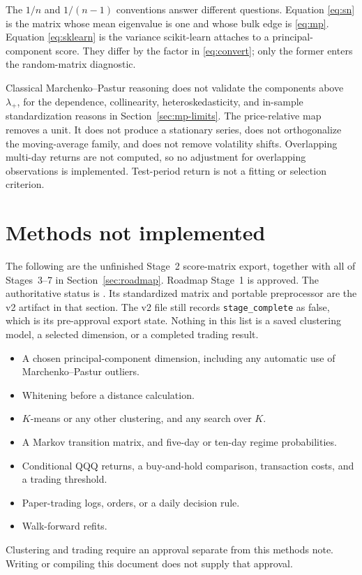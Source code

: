 \documentclass[11pt]{article}
\begin{document}
The \(1/n\) and \(1/(n-1)\) conventions answer different questions.
Equation \eqref{eq:sn} is the matrix whose mean eigenvalue is one and whose bulk edge is \eqref{eq:mp}.
Equation \eqref{eq:sklearn} is the variance scikit-learn attaches to a principal-component score.
They differ by the factor in \eqref{eq:convert}; only the former enters the random-matrix diagnostic.

Classical Marchenko--Pastur reasoning does not validate the components above \(\lambda_+\), for the dependence, collinearity, heteroskedasticity, and in-sample standardization reasons in Section~\ref{sec:mp-limits}.
The price-relative map removes a unit.
It does not produce a stationary series, does not orthogonalize the moving-average family, and does not remove volatility shifts.
Overlapping multi-day returns are not computed, so no adjustment for overlapping observations is implemented.
Test-period return is not a fitting or selection criterion.

\section{Methods not implemented}

The following are the unfinished Stage~2 score-matrix export, together with all of Stages~3--7 in Section~\ref{sec:roadmap}.
Roadmap Stage~1 is approved.
The authoritative status is .
Its standardized matrix and portable preprocessor are the v2 artifact in that section.
The v2 file  still records \texttt{stage\_complete} as false, which is its pre-approval export state.
Nothing in this list is a saved clustering model, a selected dimension, or a completed trading result.

\begin{itemize}
\item A chosen principal-component dimension, including any automatic use of Marchenko--Pastur outliers.
\item Whitening before a distance calculation.
\item \(K\)-means or any other clustering, and any search over \(K\).
\item A Markov transition matrix, and five-day or ten-day regime probabilities.
\item Conditional QQQ returns, a buy-and-hold comparison, transaction costs, and a trading threshold.
\item Paper-trading logs, orders, or a daily decision rule.
\item Walk-forward refits.
\end{itemize}

Clustering and trading require an approval separate from this methods note.
Writing or compiling this document does not supply that approval.
\end{document}
